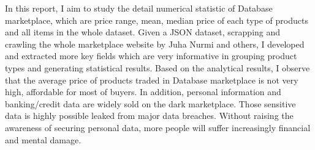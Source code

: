 In this report, I aim to study the detail numerical statistic of Database marketplace,
which are price range, mean, median price of each type of products and all items in
the whole dataset. Given a JSON dataset, scrapping and crawling the whole marketplace website
by Juha Nurmi and others, I developed and extracted more key fields which are
very informative in grouping product types and generating statistical results.
Based on the analytical results, I observe that the average price of products
traded in Database marketplace is not very high, affordable for most of buyers.
In addition, personal information and banking/credit data are widely sold on
the dark marketplace. Those sensitive data is highly possible leaked from major
data breaches. Without raising the awareness of securing personal data,
more people will suffer increasingly financial and mental damage.